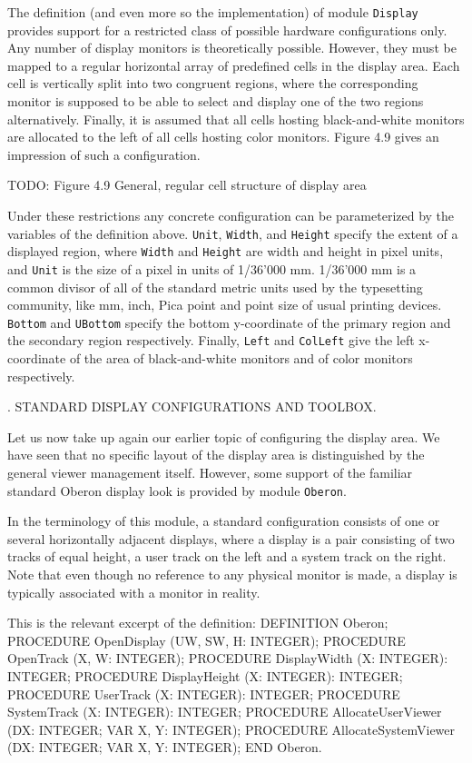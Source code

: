 \noindent The definition (and even more so the implementation) of module {\tt Display\/}
provides support for a restricted class of possible hardware
configurations only. Any number of display monitors is theoretically
possible. However, they must be mapped to a regular horizontal array
of predefined cells in the display area. Each cell is vertically split
into two congruent regions, where the corresponding monitor is
supposed to be able to select and display one of the two regions
alternatively. Finally, it is assumed that all cells hosting
black-and-white monitors are allocated to the left of all cells
hosting color monitors. Figure 4.9 gives an impression of such a
configuration.

TODO: Figure 4.9 General, regular cell structure of display area

Under these restrictions any concrete configuration can be
parameterized by the variables of the definition above. {\tt Unit\/}, {\tt Width\/},
and {\tt Height\/} specify the extent of a displayed region, where {\tt Width\/} and
{\tt Height\/} are width and height in pixel units, and {\tt Unit\/} is the size of a
pixel in units of 1/36’000 mm. 1/36’000 mm is a common divisor of all
of the standard metric units used by the typesetting community, like
mm, inch, Pica point and point size of usual printing devices. {\tt Bottom\/}
and {\tt UBottom\/} specify the bottom y-coordinate of the primary region and
the secondary region respectively. Finally, {\tt Left\/} and {\tt ColLeft\/} give the
left x-coordinate of the area of black-and-white monitors and of color
monitors respectively.

. STANDARD DISPLAY CONFIGURATIONS AND TOOLBOX.

Let us now take up again our earlier topic of configuring the display
area. We have seen that no specific layout of the display area is
distinguished by the general viewer management itself. However, some
support of the familiar standard Oberon display look is provided by
module {\tt Oberon\/}.

In the terminology of this module, a standard configuration consists
of one or several horizontally adjacent displays, where a display is a
pair consisting of two tracks of equal height, a user track on the
left and a system track on the right. Note that even though no
reference to any physical monitor is made, a display is typically
associated with a monitor in reality.

This is the relevant excerpt of the definition:
\begintt
DEFINITION Oberon;
  PROCEDURE OpenDisplay (UW, SW, H: INTEGER);
  PROCEDURE OpenTrack (X, W: INTEGER);
  PROCEDURE DisplayWidth (X: INTEGER): INTEGER;
  PROCEDURE DisplayHeight (X: INTEGER): INTEGER;
  PROCEDURE UserTrack (X: INTEGER): INTEGER;
  PROCEDURE SystemTrack (X: INTEGER): INTEGER;
  PROCEDURE AllocateUserViewer (DX: INTEGER; VAR X, Y: INTEGER);
  PROCEDURE AllocateSystemViewer (DX: INTEGER; VAR X, Y: INTEGER);
END Oberon.
\endtt

